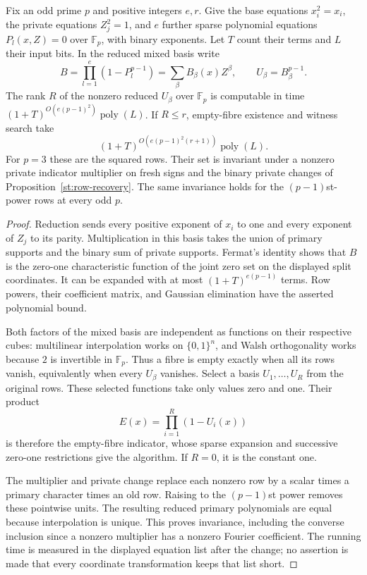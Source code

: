 \begin{theorem}
\label{st:split-rank}
Fix an odd prime $p$ and positive integers $e,r$. Give the base equations $x_i^2=x_i$, the private equations $Z_j^2=1$, and $e$ further sparse polynomial equations $P_l(x,Z)=0$ over $\mathbb F_p$, with binary exponents. Let $T$ count their terms and $L$ their input bits. In the reduced mixed basis write
\[
 B=\prod_{l=1}^e(1-P_l^{p-1})=\sum_\beta B_\beta(x)Z^\beta,
 \qquad U_\beta=B_\beta^{p-1}.
\]
The rank $R$ of the nonzero reduced $U_\beta$ over $\mathbb F_p$ is computable in time $(1+T)^{O(e(p-1)^2)}\operatorname{poly}(L)$. If $R\le r$, empty-fibre existence and witness search take
\[
 (1+T)^{O(e(p-1)^2(r+1))}\operatorname{poly}(L).
\]
For $p=3$ these are the squared rows. Their set is invariant under a nonzero private indicator multiplier on fresh signs and the binary private changes of Proposition~\ref{st:row-recovery}. The same invariance holds for the $(p-1)$st-power rows at every odd $p$.
\end{theorem}
\begin{proof}
Reduction sends every positive exponent of $x_i$ to one and every exponent of $Z_j$ to its parity. Multiplication in this basis takes the union of primary supports and the binary sum of private supports. Fermat's identity shows that $B$ is the zero-one characteristic function of the joint zero set on the displayed split coordinates. It can be expanded with at most $(1+T)^{e(p-1)}$ terms. Row powers, their coefficient matrix, and Gaussian elimination have the asserted polynomial bound.

Both factors of the mixed basis are independent as functions on their respective cubes: multilinear interpolation works on $\{0,1\}^n$, and Walsh orthogonality works because $2$ is invertible in $\mathbb F_p$. Thus a fibre is empty exactly when all its rows vanish, equivalently when every $U_\beta$ vanishes. Select a basis $U_1,\ldots,U_R$ from the original rows. These selected functions take only values zero and one. Their product
\[
 E(x)=\prod_{i=1}^R(1-U_i(x))
\]
is therefore the empty-fibre indicator, whose sparse expansion and successive zero-one restrictions give the algorithm. If $R=0$, it is the constant one.

The multiplier and private change replace each nonzero row by a scalar times a primary character times an old row. Raising to the $(p-1)$st power removes these pointwise units. The resulting reduced primary polynomials are equal because interpolation is unique. This proves invariance, including the converse inclusion since a nonzero multiplier has a nonzero Fourier coefficient. The running time is measured in the displayed equation list after the change; no assertion is made that every coordinate transformation keeps that list short.
\end{proof}
